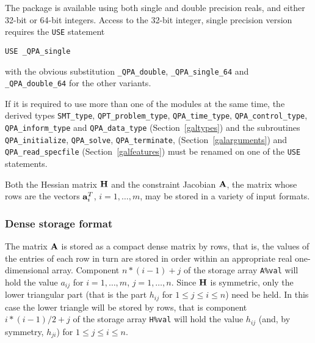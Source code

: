 \documentclass{galahad}
\newcommand{\packagename}{QPA}
\newcommand{\fullpackagename}{\libraryname\_\packagename}
\begin{document}

\galhowto

The package is available using both single and double precision reals, 
and either 32-bit or 64-bit integers. Access to the 32-bit integer,
single precision version requires the {\tt USE} statement
\medskip

\hspace{8mm} {\tt USE \fullpackagename\_single}

\medskip
\noindent
with the obvious substitution {\tt \fullpackagename\_double},
{\tt \fullpackagename\_single\_64} and 
{\tt \fullpackagename\_double\_64} for the other variants.

\noindent
If it is required to use more than one of the modules at the same time, 
the derived types
{\tt SMT\_type}, 
{\tt QPT\_problem\_type}, 
{\tt \packagename\_time\_type}, 
{\tt \packagename\_control\_type}, 
{\tt \packagename\_inform\_type} 
and
{\tt \packagename\_data\_type}
(Section~\ref{galtypes})
and the subroutines
{\tt \packagename\_initialize}, 
{\tt \packagename\_\-solve},
{\tt \packagename\_terminate},
(Section~\ref{galarguments})
and 
{\tt \packagename\_read\_specfile}
(Section~\ref{galfeatures})
must be renamed on one of the {\tt USE} statements.


\galmatrix
Both the Hessian matrix ${\mathbf{H}}$ and
the constraint Jacobian ${\mathbf{A}}$, the matrix 
whose rows are the vectors ${\mathbf{a}}_{i}^{T}$, $i = 1, \ldots , m$, 
may be stored in a variety of input formats.

\subsubsection{Dense storage format}\label{dense}
The matrix ${\mathbf{A}}$ is stored as a compact 
dense matrix by rows, that is, the values of the entries of each row in turn are
stored in order within an appropriate real one-dimensional array.
Component $n \ast (i-1) + j$ of the storage array {\tt A\%val} will hold the 
value $a_{ij}$ for $i = 1, \ldots , m$, $j = 1, \ldots , n$.
Since ${\mathbf{H}}$ is symmetric, only the lower triangular part (that is the part 
$h_{ij}$ for $1 \leq j \leq i \leq n$) need be held. In this case
the lower triangle will be stored by rows, that is 
component $i \ast (i-1)/2 + j$ of the storage array {\tt H\%val}  
will hold the value $h_{ij}$ (and, by symmetry, $h_{ji}$)
for $1 \leq j \leq i \leq n$.
\end{document}

